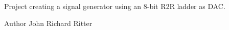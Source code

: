 Project creating a signal generator using an 8-\/bit R2R ladder as D\+AC. \begin{DoxyAuthor}{Author}
John Richard Ritter 
\end{DoxyAuthor}
